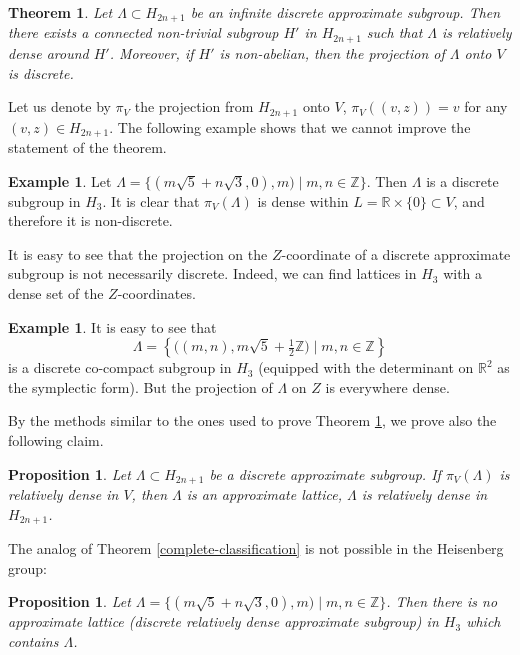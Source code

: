 \documentclass[JEP,XML,SOM,Unicode,NoEqCountersInSection]{cedram}
\newcommand{\bR}{\mathbb{R}}
\newcommand{\bZ}{\mathbb{Z}}
\newcounter{dummy} \numberwithin{dummy}{section}
\theoremstyle{plain}
\newtheorem{prop}[dummy]{Proposition}
\newtheorem{thm}[dummy]{Theorem}
\theoremstyle{definition}
\newtheorem{example}[dummy]{Example}
\begin{document}
\begin{thm}
\label{heis-thm}
Let $\Lambda \subset H_{2n+1}$ be an infinite discrete approximate subgroup. Then there exists a connected non-trivial subgroup $H'$ in $H_{2n+1}$ such that $\Lambda$ is relatively dense around $H'$. Moreover, if $H'$ is non-abelian, then the projection of $\Lambda$ onto $V$ is discrete.
\end{thm}

Let us denote by $\pi_V$ the projection from $H_{2n+1}$ onto $V$, \ie $\pi_V((v,z)) = v$ for any $(v,z) \in H_{2n+1}$. The following example shows that we cannot improve the statement of the theorem.

\begin{example}
Let $\Lambda = \{(m\sqrt{5} + n \sqrt{3},0), m) \mid m,n \in \bZ\}$. Then $\Lambda$ is a discrete subgroup in $H_3$. It is clear that $\pi_V(\Lambda)$ is dense within $L = \bR \times \{0\} \subset V$, and therefore it is non-discrete.
\end{example}

It is easy to see that the projection on the $Z$-coordinate of a discrete approximate subgroup is not necessarily discrete. Indeed, we can find lattices in $H_3$ with a dense set of the $Z$-coordinates.

\begin{example}
It is easy to see that
\[
\Lambda = \left\{ \bigl((m,n), m\sqrt{5} + \tfrac{1}{2} \bZ\bigr) \mid m,n \in \bZ \right\}
\]
is a discrete co-compact subgroup in $H_3$ (equipped with the determinant on $\bR^2$ as the symplectic form). But the projection of $\Lambda$ on $Z$ is everywhere dense.
\end{example}

By the methods similar to the ones used to prove Theorem \ref{heis-thm}, we prove also the following claim.

\begin{prop}
\label{heis-prop}
Let $\Lambda \subset H_{2n+1}$ be a discrete approximate subgroup. If $\pi_V(\Lambda)$ is relatively dense in $V$, then $\Lambda$ is an approximate lattice, \ie $\Lambda$ is relatively dense in $H_{2n+1}$.
\end{prop}

The analog of Theorem \ref{complete-classification} is not possible in the Heisenberg group:

\begin{prop}
\label{ful-class-impossible}
Let $\Lambda = \{(m\sqrt{5} + n \sqrt{3},0), m) \mid m,n \in \bZ\}$. Then there is no approximate lattice (discrete relatively dense approximate subgroup) in $H_3$ which contains $\Lambda$.
\end{prop}
\end{document}

